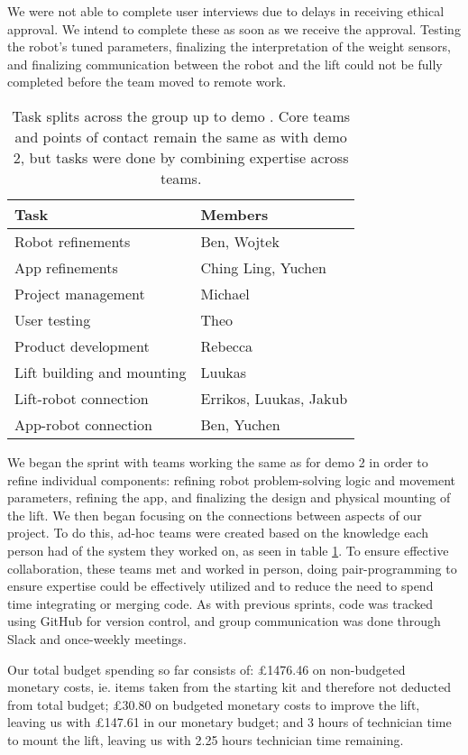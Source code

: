 \documentclass{article}
\begin{document}
We were not able to complete user interviews due to delays in receiving ethical approval. We intend to complete these as soon as we receive the approval. Testing the robot's tuned parameters, finalizing the interpretation of the weight sensors, and finalizing communication between the robot and the lift could not be fully completed before the team moved to remote work.

\begin{table}[]
  \begin{tabular}{l|l}
    Task & Members \\
    \hline
    Robot refinements & Ben, Wojtek \\
    App refinements & Ching Ling, Yuchen \\
    Project management & Michael \\
    User testing & Theo \\
    Product development & Rebecca \\
    Lift building and mounting & Luukas \\
    Lift-robot connection & Errikos, Luukas, Jakub \\
    App-robot connection & Ben, Yuchen \\
  \end{tabular}
  \caption{Task splits across the group up to demo \demoNumber. Core teams and points of contact remain the same as with demo 2, but tasks were done by combining expertise across teams. }
  \label{tab:group-split}
\end{table}

We began the sprint with teams working the same as for demo 2 in order to refine individual components: refining robot problem-solving logic and movement parameters, refining the app, and finalizing the design and physical mounting of the lift. We then began focusing on the connections between aspects of our project. To do this, ad-hoc teams were created based on the knowledge each person had of the system they worked on, as seen in table \ref{tab:group-split}. To ensure effective collaboration, these teams met and worked in person, doing pair-programming to ensure expertise could be effectively utilized and to reduce the need to spend time integrating or merging code. As with previous sprints, code was tracked using GitHub for version control, and group communication was done through Slack and once-weekly meetings.

Our total budget spending so far consists of: \pounds 1476.46 on non-budgeted monetary costs, ie. items taken from the starting kit and therefore not deducted from total budget; \pounds 30.80 on budgeted monetary costs to improve the lift, leaving us with \pounds 147.61 in our monetary budget; and 3 hours of technician time to mount the lift, leaving us with 2.25 hours technician time remaining. 
\end{document}
